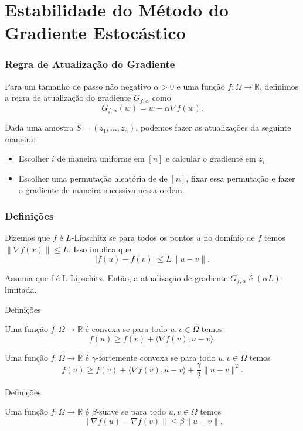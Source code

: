 \documentclass{beamer}
\begin{document}
\section{Estabilidade do Método do Gradiente Estocástico}
\begin{frame}
\tableofcontents[currentsection]
\end{frame}

\begin{frame}
\frametitle{Regra de Atualização do Gradiente}
\begin{definition}[3.1]
Para um tamanho de passo não negativo \(\alpha > 0\) e uma função \(f:\Omega \rightarrow \mathbb{R}\), definimos a regra de atualização do gradiente \(G_{f,\alpha}\) como
$$ G_{f,\alpha}(w) = w - \alpha\nabla f(w). $$ 
\end{definition}
Dada uma amostra $S=(z_1,\ldots,z_n)$, podemos fazer as atualizações da seguinte maneira:
\begin{itemize}
    \item Escolher $i$ de maneira uniforme em $[n]$ e calcular o gradiente em $z_i$
    \item Escolher uma permutação aleatória de de $[n]$, fixar essa permutação e fazer o gradiente de maneira sucessiva nessa ordem.
\end{itemize}
\end{frame}

\begin{frame}
\frametitle{Definições}
\begin{definition}[3.2]
Dizemos que $f$ é $L$-Lipschitz se para todos os pontos $u$ no domínio de $f$ temos \(\|\nabla f(x)\| \le L\). Isso implica que
$$ |f(u) - f(v)| \le L\|u-v\|. $$ 
\end{definition}
\begin{lemma}[3.3]
Assuma que f é L-Lipschitz. Então, a atualização de gradiente \(G_{f,\alpha}\) é \((\alpha L)\)-limitada. 
\end{lemma} 
\end{frame}
 

\begin{frame}{Definições}
\begin{definition}[3.4]
Uma função \(f:\Omega \rightarrow \mathbb{R}\) é convexa se para todo \(u, v \in \Omega\) temos
$$ f(u) \ge f(v) + \langle\nabla f(v), u-v\rangle. $$
\end{definition} 
  
\begin{definition}[3.5]
Uma função \(f:\Omega \rightarrow \mathbb{R}\) é \(\gamma\)-fortemente convexa se para todo \(u, v \in \Omega\) temos
$$ f(u) \ge f(v) + \langle\nabla f(v), u-v\rangle + \frac{\gamma}{2}\|u-v\|^2. $$
\end{definition}
\end{frame}
\begin{frame}{Definições}
\begin{definition}[3.6]
Uma função \(f:\Omega \rightarrow \mathbb{R}\) é \(\beta\)-suave se para todo \(u, v \in \Omega\) temos
$$ \|\nabla f(u) - \nabla f(v)\| \le \beta\|u-v\|. $$ 
\end{definition}
\end{frame}
\end{document}
